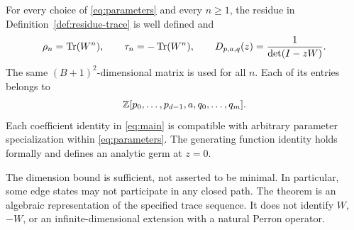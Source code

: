 \begin{theorem}\label{thm:main}
For every choice of \eqref{eq:parameters} and every $n\ge1$, the residue
in Definition~\ref{def:residue-trace} is well defined and
\begin{equation}\label{eq:main}
 \rho_n=\operatorname{Tr}(W^n),\qquad
 \tau_n=-\operatorname{Tr}(W^n),\qquad
 D_{p,a,q}(z)=\frac{1}{\det(I-zW)}.
\end{equation}
The same $(B+1)^2$-dimensional matrix is used for all $n$. Each of its
entries belongs to
\begin{equation}\label{eq:coefficient-ring}
 \mathbb Z[p_0,\ldots,p_{d-1},a,q_0,\ldots,q_m].
\end{equation}
Each coefficient identity in \eqref{eq:main} is compatible with arbitrary
parameter specialization within \eqref{eq:parameters}. The generating
function identity holds formally and defines an analytic germ at $z=0$.
\end{theorem}

The dimension bound is sufficient, not asserted to be minimal. In
particular, some edge states may not participate in any closed path.
The theorem is an algebraic representation of the specified trace
sequence. It does not identify $W$, $-W$, or an infinite-dimensional
extension with a natural Perron operator.
